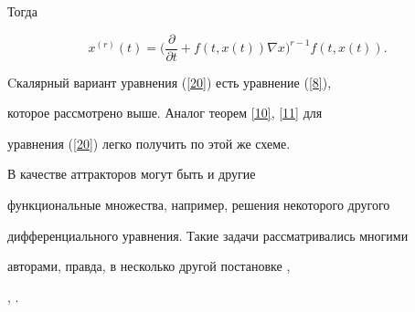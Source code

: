 Тогда


\begin{equation}


\label{20}


x^{(r)}(t)=\bigg(\frac{\partial}{\partial t} +f(t,x(t))\nabla


x\bigg)^{r-1}f(t,x(t)).


\end{equation}


Cкалярный вариант уравнения (\ref{20}) есть уравнение (\ref{8}),


которое рассмотрено выше. Аналог теорем \ref{10}, \ref{11} для


уравнения (\ref{20}) легко получить по этой же схеме.





В качестве аттракторов могут быть и другие


функциональные множества, например, решения некоторого другого


дифференциального уравнения. Такие задачи рассматривались многими


авторами, правда, в несколько другой постановке \cite{3},


\cite{13}, \cite{14}.





